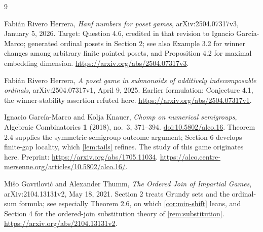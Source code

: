 \documentclass[11pt,letterpaper]{article}
\numberwithin{equation}{section}
\theoremstyle{definition}
\theoremstyle{remark}
\begin{document}
\clearpage
\begin{thebibliography}{9}

Fabi\'an Rivero Herrera,
\emph{Hanf numbers for poset games},
arXiv:2504.07317v3, January 5, 2026.
Target: Question 4.6, credited in that revision to Ignacio
Garc\'ia-Marco; generated ordinal posets in Section 2; see also
Example 3.2 for winner changes among arbitrary finite pointed posets,
and Proposition 4.2 for maximal embedding dimension.
\url{https://arxiv.org/abs/2504.07317v3}.

Fabi\'an Rivero Herrera,
\emph{A poset game in submonoids of additively indecomposable ordinals},
arXiv:2504.07317v1, April 9, 2025.
Earlier formulation: Conjecture 4.1, the winner-stability assertion
refuted here.
\url{https://arxiv.org/abs/2504.07317v1}.

Ignacio Garc\'ia-Marco and Kolja Knauer,
\emph{Chomp on numerical semigroups},
Algebraic Combinatorics \textbf{1} (2018), no.~3, 371--394.
\href{https://doi.org/10.5802/alco.16}{doi:10.5802/alco.16}.
Theorem 2.4 supplies the symmetric-semigroup outcome argument;
Section 6 develops finite-gap locality, which \cref{lem:tails} refines.
The study of this game originates here.
Preprint: \url{https://arxiv.org/abs/1705.11034}.
\url{https://alco.centre-mersenne.org/articles/10.5802/alco.16/}.

Mi\v{s}o Gavrilovi\'c and Alexander Thumm,
\emph{The Ordered Join of Impartial Games},
arXiv:2104.13131v2, May 18, 2021.
Section 2 treats Grundy sets and the ordinal-sum formula; see especially
Theorem 2.6, on which \cref{cor:min-shift} leans, and Section 4 for the
ordered-join substitution theory of \cref{rem:substitution}.
\url{https://arxiv.org/abs/2104.13131v2}.

\end{thebibliography}
\end{document}
